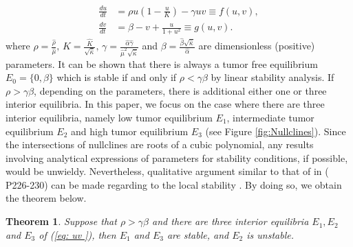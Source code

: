\documentclass{aims}
\newtheorem{theorem}{Theorem}[section]
\theoremstyle{definition}
\begin{document}
\begin{subequations}\label{eq: uv }
\begin{align}
\frac{du}{dt} & =\rho u(1-\frac{u}{K})-\gamma uv\equiv f(u,v),\\
\frac{dv}{dt} & =\beta-v+\frac{u}{1+u^{2}}\equiv g(u,v).
\end{align}
\end{subequations} where $\rho=\frac{\hat{\rho}}{\hat{\mu}},\,K=\frac{\hat{K}}{\sqrt{\hat{\kappa}}},\,\gamma=\frac{\hat{\alpha}\hat{\gamma}}{\hat{\mu}^{2}\sqrt{\hat{\kappa}}}$ and $\beta=\frac{\hat{\beta}\sqrt{\hat{\kappa}}}{\hat{\alpha}}$ are dimensionless (positive) parameters.
It can be shown that there is always a tumor free equilibrium $E_{0}=\{0,\beta\}$
which is stable if and only if $\rho<\gamma\beta$ by linear stability analysis.
If $\rho>\gamma \beta$, depending on the parameters, there is additional either one or three interior
equilibria. In this paper, we focus on the case where there are
three interior equilibria, namely low tumor equilibrium $E_{1}$, intermediate tumor equilibrium $E_{2}$ and high tumor equilibrium $E_{3}$
(see Figure \ref{fig:Nullclines}). Since the intersections of nullclines
are roots of a cubic polynomial, any results involving analytical
expressions of parameters for stability conditions, if possible, would
be unwieldy. Nevertheless, qualitative argument similar to that of in (\cite{murraymathematical} P226-230) can be made regarding to the local stability .
By doing so, we obtain the theorem below.
\begin{theorem} \label{thm:ODE local stability}
Suppose that $\rho>\gamma\beta$ and there are three interior equilibria $E_1,E_2$ and $E_3$ of (\ref{eq: uv }), then $E_1$ and $E_3$ are stable, and $E_2$ is unstable.   
\end{theorem}
\end{document}
